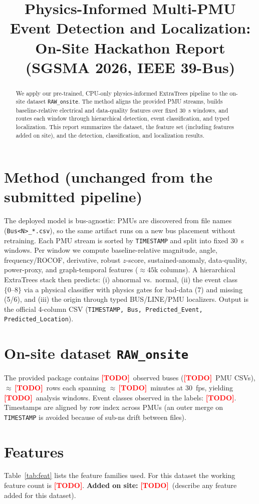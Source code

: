 \documentclass[conference]{IEEEtran}
\title{Physics-Informed Multi-PMU Event Detection and Localization:\\
On-Site Hackathon Report (SGSMA 2026, IEEE 39-Bus)}
\author{\IEEEauthorblockN{Jorge Luis Mayorga Taborda \and Yessica Africano Rodriguez}
\IEEEauthorblockA{Universidad de los Andes \\ SGSMA 2026 Synchrophasor Anomaly Detection Competition --- On-Site Round}}
\newcommand{\TODO}{\textcolor{red}{\textbf{[TODO]}}}
\newcommand{\DSname}{RAW\_onsite}        %
\newcommand{\DSpmus}{\TODO}              %
\newcommand{\DSbuses}{\TODO}             %
\newcommand{\DSrows}{\TODO}              %
\newcommand{\DSspan}{\TODO}              %
\newcommand{\DSwindows}{\TODO}           %
\newcommand{\DSclasses}{\TODO}           %
\newcommand{\NewFeatCount}{\TODO}        %
\newcommand{\FeaturesAdded}{\TODO\ (describe any feature added for this dataset)}
\begin{document}
\maketitle

\begin{abstract}
We apply our pre-trained, CPU-only physics-informed ExtraTrees pipeline to the
on-site dataset \texttt{\DSname}. The method aligns the provided PMU streams,
builds baseline-relative electrical and data-quality features over fixed 30~s
windows, and routes each window through hierarchical detection, event
classification, and typed localization. This report summarizes the dataset, the
feature set (including features added on site), and the detection,
classification, and localization results.
\end{abstract}

\section{Method (unchanged from the submitted pipeline)}
The deployed model is bus-agnostic: PMUs are discovered from file names
(\texttt{Bus<N>\_*.csv}), so the same artifact runs on a new bus placement
without retraining. Each PMU stream is sorted by \texttt{TIMESTAMP} and split
into fixed 30~s windows. Per window we compute baseline-relative magnitude,
angle, frequency/ROCOF, derivative, robust $z$-score, sustained-anomaly,
data-quality, power-proxy, and graph-temporal features
($\approx\!45$k columns). A hierarchical ExtraTrees stack then predicts:
(i) abnormal vs.\ normal, (ii) the event class $\{0\text{--}8\}$ via a physical
classifier with physics gates for bad-data (7) and missing (5/6), and
(iii) the origin through typed BUS/LINE/PMU localizers. Output is the official
4-column CSV (\texttt{TIMESTAMP, Bus, Predicted\_Event, Predicted\_Location}).

\section{On-site dataset \texttt{\DSname}}
The provided package contains \DSbuses\ observed buses (\DSpmus\ PMU CSVs),
$\approx$\,\DSrows\ rows each spanning $\approx$\,\DSspan\ minutes at 30~fps,
yielding \DSwindows\ analysis windows. Event classes observed in the labels:
\DSclasses. Timestamps are aligned by row index across PMUs (an outer merge on
\texttt{TIMESTAMP} is avoided because of sub-ns drift between files).

\section{Features}
Table~\ref{tab:feat} lists the feature families used. For this dataset the
working feature count is \NewFeatCount.
\textbf{Added on site:} \FeaturesAdded.
\end{document}
